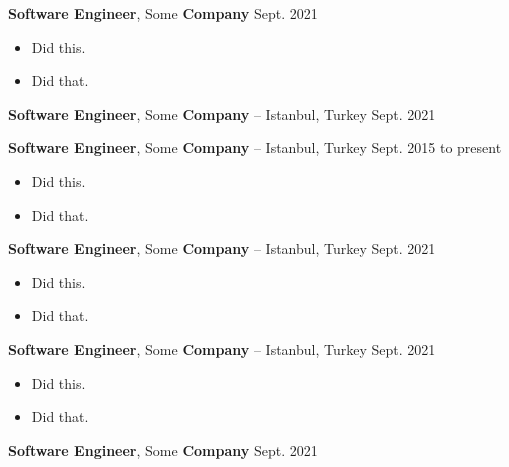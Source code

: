 \documentclass[10pt, letterpaper]{article}
\newenvironment{highlights}{
        \begin{itemize}[
                topsep=0pt,
                partopsep=0pt,
                itemsep=0pt,
                leftmargin=10pt
            ]
    }{
        \end{itemize}
    } %
\begin{document}
        \vspace{8pt}

        \textbf{Software Engineer}, Some \textbf{Company} \hfill Sept. 2021

        \begin{highlights}
        \item Did this.
        \item Did that.
        \end{highlights}


        \vspace{8pt}

        \textbf{Software Engineer}, Some \textbf{Company} -- Istanbul, Turkey \hfill Sept. 2021



        \vspace{8pt}

        \textbf{Software Engineer}, Some \textbf{Company} -- Istanbul, Turkey \hfill Sept. 2015 to present

        \begin{highlights}
        \item Did this.
        \item Did that.
        \end{highlights}


        \vspace{8pt}

        \textbf{Software Engineer}, Some \textbf{Company} -- Istanbul, Turkey \hfill Sept. 2021

        \begin{highlights}
        \item Did this.
        \item Did that.
        \end{highlights}


        \vspace{8pt}

        \textbf{Software Engineer}, Some \textbf{Company} -- Istanbul, Turkey \hfill Sept. 2021

        \begin{highlights}
        \item Did this.
        \item Did that.
        \end{highlights}


        \vspace{8pt}

        \textbf{Software Engineer}, Some \textbf{Company} \hfill Sept. 2021
\end{document}
